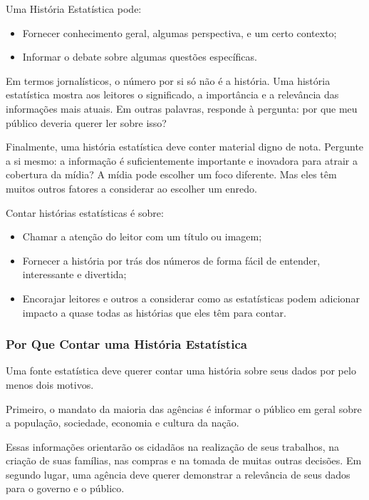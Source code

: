 Uma História Estatística pode:

\begin{itemize}
    \item Fornecer conhecimento geral, algumas perspectiva, e um certo contexto;
    \item Informar o debate sobre algumas questões específicas.
\end{itemize}


Em termos jornalísticos, o número por si só não é a história. Uma história estatística mostra aos leitores o significado, a importância e a relevância das informações mais atuais. Em outras palavras, responde à pergunta: por que meu público deveria querer ler sobre isso?\vskip0.3cm 

Finalmente, uma história estatística deve conter material digno de nota. Pergunte a si mesmo: a informação é suficientemente importante e inovadora para atrair a cobertura da mídia? A mídia pode escolher um foco diferente. Mas eles têm muitos outros fatores a considerar ao escolher um enredo.

Contar histórias estatísticas é sobre:

\begin{itemize}
    \item Chamar a atenção do leitor com um título ou imagem;
    \item Fornecer a história por trás dos números de forma fácil de entender, interessante e divertida;
    \item Encorajar leitores e outros a considerar como as estatísticas podem adicionar impacto a quase todas as histórias que eles têm para contar.
\end{itemize}

\subsubsection{Por Que Contar uma História Estatística}

Uma fonte estatística deve querer contar uma história sobre seus dados por pelo menos dois motivos.\vskip0.3cm 

Primeiro, o mandato da maioria das agências é informar o público em geral sobre a população, sociedade, economia e cultura da nação.\vskip0.3cm 

Essas informações orientarão os cidadãos na realização de seus trabalhos, na criação de suas famílias, nas compras e na tomada de muitas outras decisões.
Em segundo lugar, uma agência deve querer demonstrar a relevância de seus dados para o governo e o público.\vskip0.3cm 

